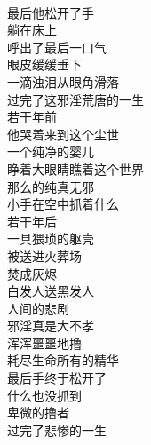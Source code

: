 \begin{poem}[尘世卑微的撸者]
    \begin{multicols}{3}
        \centering~\\
        最后他松开了手 \\ 躺在床上 \\ 呼出了最后一口气 \\ 眼皮缓缓垂下 \\ 一滴浊泪从眼角滑落 \\ 过完了这邪淫荒唐的一生 \\ 若干年前 \\ 他哭着来到这个尘世 \\ 一个纯净的婴儿 \\ 睁着大眼睛瞧着这个世界 \\ 那么的纯真无邪 \\ 小手在空中抓着什么 \\ 若干年后 \\ 一具猥琐的躯壳 \\ 被送进火葬场 \\ 焚成灰烬 \\ 白发人送黑发人 \\ 人间的悲剧 \\ 邪淫真是大不孝 \\ 浑浑噩噩地撸 \\ 耗尽生命所有的精华 \\ 最后手终于松开了 \\ 什么也没抓到 \\ 卑微的撸者 \\ 过完了悲惨的一生
    \end{multicols}
\end{poem}

